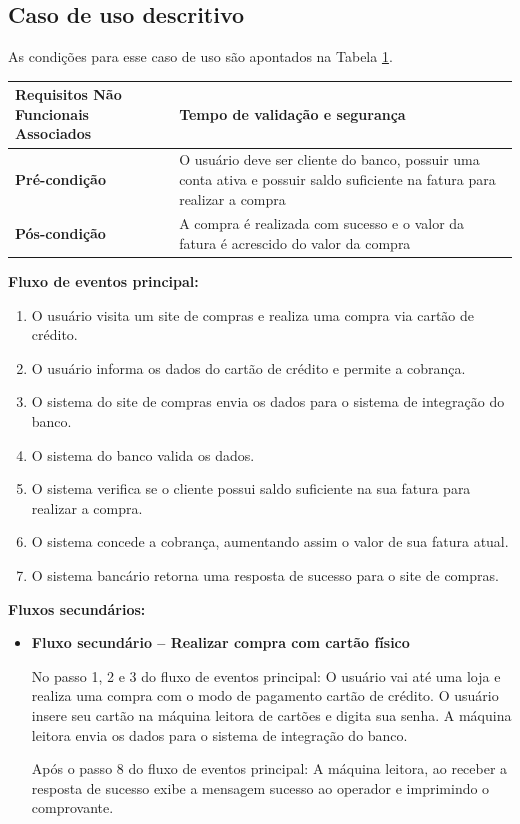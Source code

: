 \subsection{Caso de uso descritivo}

As condições para esse caso de uso são apontados na Tabela \ref{tab:compraCartao}.

\begin{table}[h]
  \centering
  \begin{tabular}{|p{4cm} | p{10cm} |}
      \hline
      \small{\textbf{Requisitos Não Funcionais Associados}}	&	Tempo de validação e segurança	\\ \hline
      \small{\textbf{Pré-condição}}	&	O usuário deve ser cliente do banco, possuir uma conta ativa e possuir saldo suficiente na fatura para realizar a compra	\\ \hline
      \small{\textbf{Pós-condição}}	&	A compra é realizada com sucesso e o valor da fatura é acrescido do valor da compra	\\ \hline
    \end{tabular}
 \label{tab:compraCartao}
\end{table}

\textbf{Fluxo de eventos principal:}

\begin{enumerate}
  \item O usuário visita um site de compras e realiza uma compra via cartão de crédito.
  \item O usuário informa os dados do cartão de crédito e permite a cobrança.
  \item O sistema do site de compras envia os dados para o sistema de integração do banco.
  \item O sistema do banco valida os dados.
  \item O sistema verifica se o cliente possui saldo suficiente na sua fatura para realizar a compra.
  \item O sistema concede a cobrança, aumentando assim o valor de sua fatura atual.
  \item O sistema bancário retorna uma resposta de sucesso para o site de compras.
\end{enumerate}

\textbf{Fluxos secundários:}

\begin{itemize}
  \item \textbf{Fluxo secundário – Realizar compra com cartão físico}

  No passo 1, 2 e 3 do fluxo de eventos principal:
  \subitem O usuário vai até uma loja e realiza uma compra com o modo de pagamento cartão de crédito.
  \subitem O usuário insere seu cartão na máquina leitora de cartões e digita sua senha.
  \subitem A máquina leitora envia os dados para o sistema de integração do banco.

  Após o passo 8 do fluxo de eventos principal:
  \subitem A máquina leitora, ao receber a resposta de sucesso exibe a mensagem sucesso ao operador e imprimindo o comprovante.
\end{itemize}

